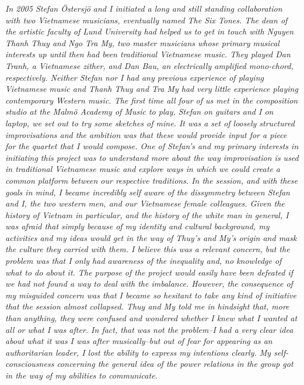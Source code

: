 \documentclass[a4paper]{article}
\begin{document}
\textit{In 2005 Stefan Östersjö and I initiated a long and still standing collaboration with two Vietnamese musicians, eventually named \emph{The Six Tones}. The dean of the artistic faculty of Lund University had helped us to get in touch with Nguyen Thanh Thuy and Ngo Tra My, two master musicians whose primary musical interests up until then had been traditional Vietnamese music. They played Dan Tranh, a Vietnamese zither, and Dan Bau, an electrically amplified mono-chord, respectively. Neither Stefan nor I had any previous experience of playing Vietnamese music and Thanh Thuy and Tra My had very little experience playing contemporary Western music. The first time all four of us met in the composition studio at the Malmö Academy of Music to play, Stefan on guitars and I on laptop, we set out to try some sketches of mine. It was a set of loosely structured improvisations and the ambition was that these would provide input for a piece for the quartet that I would compose. One of Stefan's and my primary interests in initiating this project was to understand more about the way improvisation is used in traditional Vietnamese music and explore ways in which we could create a common platform between our respective traditions. In the session, and with these goals in mind, I became incredibly self aware of the dissymmetry between Stefan and I, the two western men, and our Vietnamese female colleagues. Given the history of Vietnam in particular, and the history of the white man in general, I was afraid that simply because of my identity and cultural background, my activities and my ideas would get in the way of Thuy's and My's origin and mask the culture they carried with them. I believe this was a relevant concern, but the problem was that I only had awareness of the inequality and, no knowledge of what to do about it. The purpose of the project would easily have been defeated if we had not found a way to deal with the imbalance. However, the consequence of my misguided concern  was that I became so hesitant to take any kind of initiative that the session almost collapsed. Thuy and My told me in hindsight that, more than anything, they were confused and wondered whether I knew what I wanted at all or what I was after. In fact, that was not the problem--I had a very clear idea about what it was I was after musically--but out of fear for appearing as an authoritarian leader, I lost the ability to express my intentions clearly. My self-consciousness concerning the general idea of the power relations in the group got in the way of my abilities to communicate.}
\end{document}
